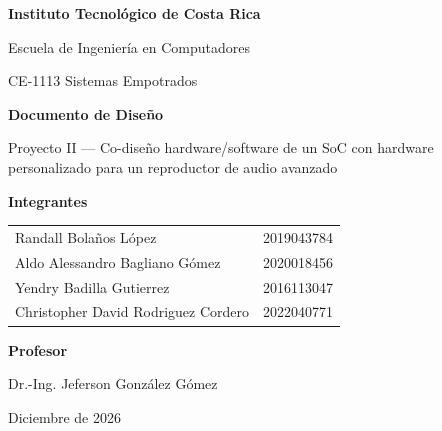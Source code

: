 \begin{titlepage}
\centering
{\large\bfseries Instituto Tecnológico de Costa Rica\par}
\vspace{0.3cm}
{\large Escuela de Ingeniería en Computadores\par}
\vspace{0.3cm}
{\large CE-1113 Sistemas Empotrados\par}
\vspace{3.0cm}
{\LARGE\bfseries Documento de Diseño\par}
\vspace{0.6cm}
{\Large Proyecto II --- Co-diseño hardware/software de un SoC con hardware
personalizado para un reproductor de audio avanzado\par}
\vspace{3.0cm}
{\large\bfseries Integrantes\par}
\vspace{0.2cm}
{\large
\begin{tabular}{ll}
Randall Bolaños López & 2019043784 \\
Aldo Alessandro Bagliano Gómez & 2020018456 \\
Yendry Badilla Gutierrez & 2016113047 \\
Christopher David Rodriguez Cordero & 2022040771 \\
\end{tabular}\par}
\vspace{1.6cm}
{\large\bfseries Profesor\par}
\vspace{0.2cm}
{\large Dr.-Ing. Jeferson González Gómez\par}
\vfill
{\large Diciembre de 2026\par}
\end{titlepage}
\thispagestyle{empty}
